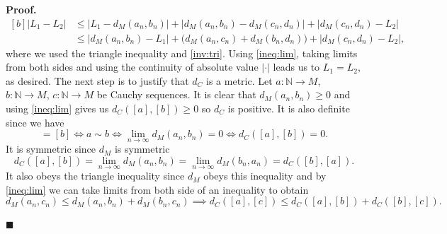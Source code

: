 \documentclass[10pt]{article}
\theoremstyle{definition}
\theoremstyle{remark}
\newenvironment{prf}{\noindent\textbf{Proof.}}{\hfill$\blacksquare$}
\begin{document}
\begin{prf}
\begin{equation}
\begin{aligned}[b]
\left|L_1-L_2\right|&\leq\left|L_1-d_M(a_n,b_n)\right|+\left|d_M(a_n,b_n)-d_M(c_n,d_n)\right|+\left|d_M(c_n,d_n)-L_2\right| \\
&\leq \left|d_M(a_n,b_n)-L_1\right|+\big(d_M(a_n,c_n)+d_M(b_n,d_n)\big)+\left|d_M(c_n,d_n)-L_2\right|,
\end{aligned}
\end{equation}
where we used the triangle inequality and \cref{inv:tri}. Using \cref{ineq:lim}, taking limits from both sides and using the continuity of absolute value $|\cdot|$ leads us to $L_1=L_2$, as desired. The next step is to justify that $d_C$ is a metric. Let $a:\mathbb{N}\to M$, $b:\mathbb{N}\to M$, $c:\mathbb{N}\to M$ be Cauchy sequences. It is clear that $d_M(a_n,b_n)\ge 0$ and using \cref{ineq:lim} gives us $d_C([a],[b])\ge 0$ so $d_C$ is positive. It is also definite since we have
\begin{equation}
[a]=[b] \iff a\sim b \iff \lim_{n\to\infty}d_M(a_n,b_n)=0 \iff d_C([a],[b])=0.
\end{equation}
It is symmetric since $d_M$ is symmetric 
\begin{equation}
d_C([a],[b])=\lim_{n\to\infty}d_M(a_n,b_n)=\lim_{n\to\infty}d_M(b_n,a_n)=d_C([b],[a]).
\end{equation}
It also obeys the triangle inequality since $d_M$ obeys this inequality and by \cref{ineq:lim} we can take limits from both side of an inequality to obtain
\begin{equation}
d_M(a_n,c_n)\leq d_M(a_n,b_n)+d_M(b_n,c_n) \implies
d_C([a],[c])\leq d_C([a],[b])+d_C([b],[c]).
\end{equation}


\end{prf}
\end{document}
